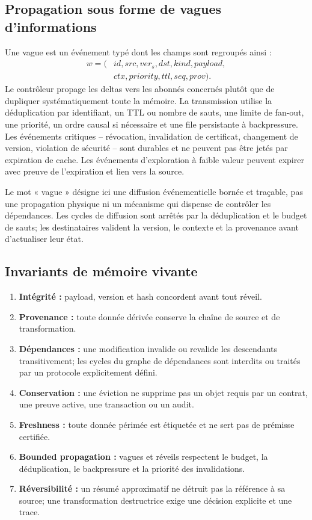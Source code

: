 \documentclass[11pt,a4paper]{article}
\theoremstyle{definition}
\theoremstyle{plain}
\theoremstyle{remark}
\begin{document}
\subsection{Propagation sous forme de vagues d'informations}
Une vague est un événement typé dont les champs sont regroupés ainsi :
\[\begin{aligned}
w=(&id,src,ver_s,dst,kind,payload,\\
&ctx,priority,ttl,seq,prov).
\end{aligned}\]
Le contrôleur propage les deltas vers les abonnés concernés plutôt que de dupliquer systématiquement toute la mémoire. La transmission utilise la déduplication par identifiant, un TTL ou nombre de sauts, une limite de fan-out, une priorité, un ordre causal si nécessaire et une file persistante à backpressure. Les événements critiques -- révocation, invalidation de certificat, changement de version, violation de sécurité -- sont durables et ne peuvent pas être jetés par expiration de cache. Les événements d'exploration à faible valeur peuvent expirer avec preuve de l'expiration et lien vers la source.

Le mot « vague » désigne ici une diffusion événementielle bornée et traçable, pas une propagation physique ni un mécanisme qui dispense de contrôler les dépendances. Les cycles de diffusion sont arrêtés par la déduplication et le budget de sauts; les destinataires valident la version, le contexte et la provenance avant d'actualiser leur état.

\subsection{Invariants de mémoire vivante}
\begin{enumerate}
\item \textbf{Intégrité :} payload, version et hash concordent avant tout réveil.
\item \textbf{Provenance :} toute donnée dérivée conserve la chaîne de source et de transformation.
\item \textbf{Dépendances :} une modification invalide ou revalide les descendants transitivement; les cycles du graphe de dépendances sont interdits ou traités par un protocole explicitement défini.
\item \textbf{Conservation :} une éviction ne supprime pas un objet requis par un contrat, une preuve active, une transaction ou un audit.
\item \textbf{Freshness :} toute donnée périmée est étiquetée et ne sert pas de prémisse certifiée.
\item \textbf{Bounded propagation :} vagues et réveils respectent le budget, la déduplication, le backpressure et la priorité des invalidations.
\item \textbf{Réversibilité :} un résumé approximatif ne détruit pas la référence à sa source; une transformation destructrice exige une décision explicite et une trace.
\end{enumerate}
\end{document}
